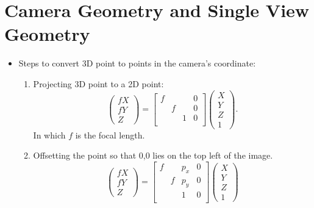 \documentclass[twocolumn]{article}
\begin{document}
\section{Camera Geometry and Single View Geometry}

\begin{itemize}
    \item Steps to convert 3D point to points in the camera's coordinate:
    \begin{enumerate}
        \item Projecting 3D point to a 2D point: 
            \begin{equation}
                \begin{pmatrix}
                    fX \\ fY \\ Z 
                \end{pmatrix} = \begin{bmatrix}
                    f & & & 0 \\
                     & f & & 0 \\
                     & & 1 & 0 \\
                \end{bmatrix}\begin{pmatrix}
                    X \\ Y \\ Z \\ 1
                \end{pmatrix}.
            \end{equation}
            In which $f$ is the focal length.
        \item Offsetting the point so that 0,0 lies on the top left of the image.
            \begin{equation}
                \begin{pmatrix}
                    fX \\ fY \\ Z 
                \end{pmatrix} = \begin{bmatrix}
                    f & & p_x & 0 \\
                     & f & p_y & 0 \\
                     & & 1 & 0 \\
                \end{bmatrix}\begin{pmatrix}
                    X \\ Y \\ Z \\ 1

\end{pmatrix}
\end{equation}
\end{enumerate}
\end{itemize}
\end{document}
